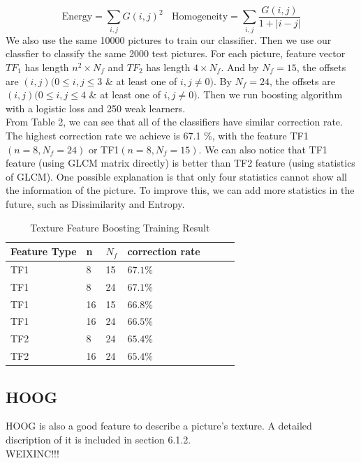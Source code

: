 \documentclass[12pt]{article}
\begin{document}
$$ \mathrm{Energy} = \sum_{i,j}G(i,j)^2 ~~~~
\mathrm{Homogeneity} = \sum_{i,j} \frac{G(i,j)}{1 + |i-j|} $$
We also use the same 10000 pictures to train our classifier. Then we use our classfier to classify the same 2000 test pictures. For each picture, feature vector $TF_1$ has length $n^2 \times N_f$ and $TF_2$ has length $4 \times N_f$. And by $N_f =15$, the offsets are $(i,j) (0 \leq i, j \leq 3$ \& at least one of $i,j \neq 0)$. By $N_f = 24$, the offsets are $(i,j) (0 \leq i, j \leq 4$ \& at least one of $i,j \neq 0)$. Then we run boosting algorithm with a logistic loss and 250 weak learners.\\
From Table 2, we can see that all of the classifiers have similar correction rate. The highest correction rate we achieve is 67.1 \%, with the feature TF1$(n =8 ,N_f = 24)$ or TF1$(n =8 ,N_f = 15)$. We can also notice that TF1 feature (using GLCM matrix directly) is better than TF2 feature (using statistics of GLCM). One possible explanation is that only four statistics cannot show all the information of the picture. To improve this, we can add more statistics in the future, such as Dissimilarity and Entropy.

\begin{table}[h]
\caption{Texture Feature Boosting Training Result}
\centering
\begin{tabular}{| l | l | l | l | l | l | l |}
\hline
Feature Type & n & $N_f$ & correction rate\\
\hline
TF1 & 8 & 15 & $67.1 \%$\\
\hline
TF1 & 8 & 24 & $67.1 \%$\\
\hline
TF1 & 16 & 15 & $66.8 \%$\\
\hline
TF1 & 16 & 24 & $66.5 \%$\\
\hline
TF2 & 8 & 24 & $65.4 \%$\\
\hline
TF2 & 16 & 24 & $65.4 \%$\\
\hline
\end{tabular}
\end{table}

\subsection {HOOG}
HOOG is also a good feature to describe a picture's texture. A detailed discription of it is included in section 6.1.2. \\
 WEIXINC!!!
\end{document}
